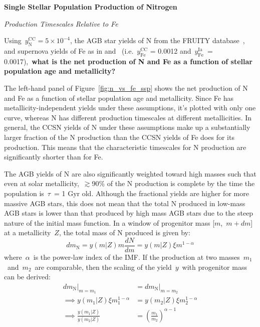 \documentclass[\main/notes.tex]{subfiles}
\begin{document}
 
\begin{center} 
\textbf{{\Large Single Stellar Population Production of Nitrogen}} 
\end{center} 

\noindent 
{\Large \textit{Production Timescales Relative to Fe}} 
\par\noindent 
Using~$y_\text{N}^\text{CC} = 5\times10^{-4}$, the AGB star yields of N from 
the FRUITY database~\citep{Cristallo2011}, and supernova yields of Fe as in 
\citet{Johnson2020} and~\citet{Weinberg2017} (i.e.~$y_\text{Fe}^\text{CC}$ = 
0.0012 and~$y_\text{Fe}^\text{Ia}$~= 0.0017),~\textbf{what is the net 
production of N and Fe as a function of stellar population age and 
metallicity?} 
\par 
The left-hand panel of Figure~\ref{fig:n_vs_fe_ssp} shows the net production of 
N and Fe as a function of stellar population age and metallicity. 
Since Fe has metallicity-independent yields under these assumptions, it's 
plotted with only one curve, whereas N has different production timescales at 
different metallicities. 
In general, the CCSN yields of N under these assumptions make up a 
substantially larger fraction of the N production than the CCSN yields of Fe 
does for its production. 
This means that the characteristic timescales for N production are 
significantly shorter than for Fe. 
\par
The AGB yields of N are also significantly weighted toward high masses such 
that even at solar metallicity,~$\gtrsim$90\% of the N production is complete 
by the time the population is~$\tau$~= 1 Gyr old. Although the fractional 
yields are higher for more massive AGB stars, this does not mean that the 
total N produced in low-mass AGB stars is lower than that produced by high mass 
AGB stars due to the steep nature of the initial mass function. In a window of 
progenitor mass [$m$,~$m + dm$] at a metallicity~$Z$, the total mass of N 
produced is given by: 
\begin{equation} 
dm_\text{N} = y(m|Z)m\frac{dN}{dm} = y(m|Z)\xi m^{1 - \alpha} 
\end{equation} 
where~$\alpha$~is the power-law index of the IMF. If the production at two 
masses~$m_1$~and~$m_2$~are comparable, then the scaling of the yield~$y$~with 
progenitor mass can be derived: 
\begin{subequations}\begin{align} 
dm_\text{N}|_{m = m_1} &= dm_\text{N}|_{m = m_2} \\ 
\implies y(m_1|Z) \xi m_1^{1 - \alpha} &= y(m_2|Z) \xi m_2^{1 - \alpha} \\ 
\implies \frac{y(m_1|Z)}{y(m_2|Z)} &= \left(\frac{m_1}{m_2}\right)^{\alpha - 1} 
\end{align}\end{subequations} 
\end{document}
